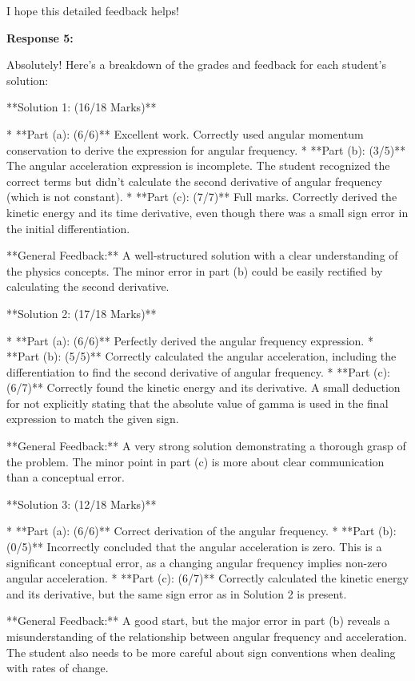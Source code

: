 \documentclass[a4paper,11pt]{article}
\begin{document}
I hope this detailed feedback helps! 

\bigskip    
\textbf{Response 5:}

Absolutely! Here's a breakdown of the grades and feedback for each student's solution:

**Solution 1: (16/18 Marks)**

* **Part (a): (6/6)** Excellent work. Correctly used angular momentum conservation to derive the expression for angular frequency.
* **Part (b): (3/5)** The angular acceleration expression is incomplete. The student recognized the correct terms but didn't calculate the second derivative of angular frequency (which is not constant).
* **Part (c): (7/7)** Full marks. Correctly derived the kinetic energy and its time derivative, even though there was a small sign error in the initial differentiation.

**General Feedback:** A well-structured solution with a clear understanding of the physics concepts. The minor error in part (b) could be easily rectified by calculating the second derivative.

**Solution 2: (17/18 Marks)**

* **Part (a): (6/6)**  Perfectly derived the angular frequency expression.
* **Part (b): (5/5)**  Correctly calculated the angular acceleration, including the differentiation to find the second derivative of angular frequency.
* **Part (c): (6/7)** Correctly found the kinetic energy and its derivative. A small deduction for not explicitly stating that the absolute value of gamma is used in the final expression to match the given sign.

**General Feedback:**  A very strong solution demonstrating a thorough grasp of the problem. The minor point in part (c) is more about clear communication than a conceptual error.

**Solution 3: (12/18 Marks)**

* **Part (a): (6/6)**  Correct derivation of the angular frequency.
* **Part (b): (0/5)** Incorrectly concluded that the angular acceleration is zero. This is a significant conceptual error, as a changing angular frequency implies non-zero angular acceleration.
* **Part (c): (6/7)** Correctly calculated the kinetic energy and its derivative, but the same sign error as in Solution 2 is present.

**General Feedback:**  A good start, but the major error in part (b) reveals a misunderstanding of the relationship between angular frequency and acceleration. The student also needs to be more careful about sign conventions when dealing with rates of change. 
\end{document}
